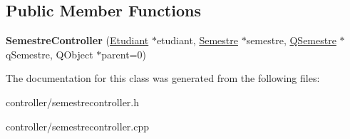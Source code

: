 \subsection*{Public Member Functions}
\begin{DoxyCompactItemize}
\item 
\hypertarget{classSemestreController_aa1dc83e3ab722ce31841aad950882045}{{\bfseries Semestre\+Controller} (\hyperlink{classEtudiant}{Etudiant} $\ast$etudiant, \hyperlink{classSemestre}{Semestre} $\ast$semestre, \hyperlink{classQSemestre}{Q\+Semestre} $\ast$q\+Semestre, Q\+Object $\ast$parent=0)}\label{classSemestreController_aa1dc83e3ab722ce31841aad950882045}

\end{DoxyCompactItemize}


The documentation for this class was generated from the following files\+:\begin{DoxyCompactItemize}
\item 
controller/semestrecontroller.\+h\item 
controller/semestrecontroller.\+cpp\end{DoxyCompactItemize}
